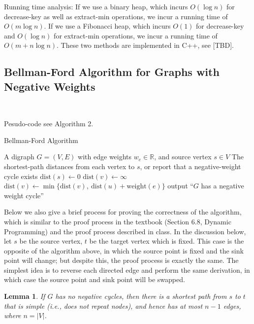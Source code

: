 \documentclass[11pt]{article}
\theoremstyle{plain}
\newtheorem{lemma}{Lemma}[section]
\begin{document}
  Running time analysis: If we use a binary heap, which incurs $O(\log n)$ for decrease-key as well as extract-min 
  operations, we incur a running time of $O(m \log n)$. If we use a Fibonacci heap, which incurs $O(1)$ for decrease-key
  and $O(\log n)$ for extract-min operations, we incur a running time of $O(m + n \log n)$. These two methods are implemented in C++, see [TBD].

\subsection{Bellman-Ford Algorithm for Graphs with Negative Weights}\

Pesudo-code see Algorithm 2.

\begin{algorithm}
  \caption{Bellman-Ford Algorithm}
  \begin{algorithmic}[1]
  \REQUIRE A digraph $G = (V, E)$ with edge weights $w_e \in \mathbb{R}$, and source vertex $s \in V$
  \ENSURE The shortest-path distances from each vertex to $s$, or report that a negative-weight cycle exists
  \STATE $\text{dist}(s) \leftarrow 0$ 
      \STATE $\text{dist}(v) \leftarrow \infty$
  \ENDFOR
          \STATE $\text{dist}(v) \leftarrow \min\{\text{dist}(v),\ \text{dist}(u) + \text{weight}(e)\}$
      \ENDFOR
  \ENDFOR
      \STATE output ``$G$ has a negative weight cycle''
  \ENDIF
  \end{algorithmic}
\end{algorithm}

  Below we also give a brief process for proving the correctness of the algorithm, which is similar to
  the proof process in the textbook (Section 6.8, Dynamic Programming) and the proof process described in class.
  In the discussion below, let $s$ be the source vertex, $t$ be the target vertex which is fixed. 
  This case is the opposite of the algorithm above, in which the source point is fixed and the sink point 
  will change; but despite this, the proof process is exactly the same. The simplest idea is to reverse each 
  directed edge and perform the same derivation, in which case the source point and sink point will be swapped.

  \begin{lemma}
    If $G$ has no negative cycles, then there is a shortest path from $s$ to $t$
    that is simple (i.e., does not repeat nodes), and hence has at most $n-1$ edges, where $n = |V|$.
  \end{lemma}
\end{document}
